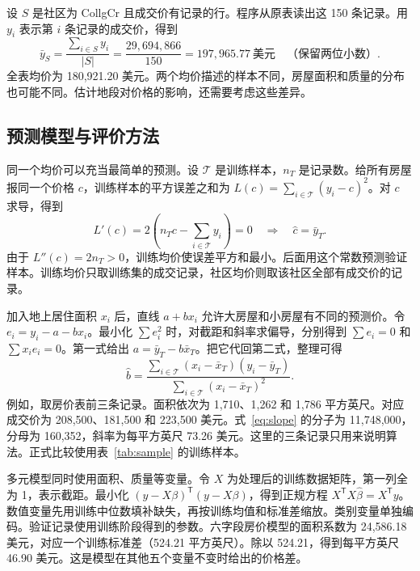 \documentclass[12pt,journal,onecolumn,a4paper]{IEEEtran}
\newcommand{\T}{\mathcal{T}}\newcommand{\V}{\mathcal{V}}
\begin{document}
设 $S$ 是社区为 CollgCr 且成交价有记录的行。程序从原表读出这 150 条记录。用 $y_i$ 表示第 $i$ 条记录的成交价，得到
\begin{equation}\label{eq:mean}
\bar y_S=\frac{\sum_{i\in S}y_i}{|S|}=\frac{29{,}694{,}866}{150}=197{,}965.77\ \text{美元}\quad\text{（保留两位小数）}.
\end{equation}
全表均价为 180,921.20 美元。两个均价描述的样本不同，房屋面积和质量的分布也可能不同。估计地段对价格的影响，还需要考虑这些差异。


\subsection{预测模型与评价方法}
同一个均价可以充当最简单的预测。设 $\T$ 是训练样本，$n_T$ 是记录数。给所有房屋报同一个价格 $c$，训练样本的平方误差之和为 $L(c)=\sum_{i\in\T}(y_i-c)^2$。对 $c$ 求导，得到
\begin{equation}\label{eq:base}
L'(c)=2\left(n_Tc-\sum_{i\in\T}y_i\right)=0
\quad\Longrightarrow\quad \hat c=\bar y_T.
\end{equation}
由于 $L''(c)=2n_T>0$，训练均价使误差平方和最小。后面用这个常数预测验证样本。训练均价只取训练集的成交记录，社区均价则取该社区全部有成交价的记录。

加入地上居住面积 $x_i$ 后，直线 $a+bx_i$ 允许大房屋和小房屋有不同的预测价。令 $e_i=y_i-a-bx_i$。最小化 $\sum e_i^2$ 时，对截距和斜率求偏导，分别得到 $\sum e_i=0$ 和 $\sum x_i e_i=0$。第一式给出 $a=\bar y_T-b\bar x_T$。把它代回第二式，整理可得
\begin{equation}\label{eq:slope}
\hat b=\frac{\sum_{i\in\T}(x_i-\bar x_T)(y_i-\bar y_T)}{\sum_{i\in\T}(x_i-\bar x_T)^2}.
\end{equation}
例如，取房价表前三条记录。面积依次为 1,710、1,262 和 1,786 平方英尺。对应成交价为 208,500、181,500 和 223,500 美元。式~\eqref{eq:slope} 的分子为 11,748,000，分母为 160,352，斜率为每平方英尺 73.26 美元。这里的三条记录只用来说明算法。正式比较使用表~\ref{tab:sample} 的训练样本。

多元模型同时使用面积、质量等变量。令 $X$ 为处理后的训练数据矩阵，第一列全为 1，表示截距。最小化 $(y-X\beta)^{\mathsf T}(y-X\beta)$，得到正规方程 $X^{\mathsf T}X\hat\beta=X^{\mathsf T}y$。数值变量先用训练中位数填补缺失，再按训练均值和标准差缩放。类别变量单独编码。验证记录使用训练阶段得到的参数。六字段房价模型的面积系数为 24,586.18 美元，对应一个训练标准差（524.21 平方英尺）。除以 524.21，得到每平方英尺 46.90 美元。这是模型在其他五个变量不变时给出的价格差。
\end{document}
